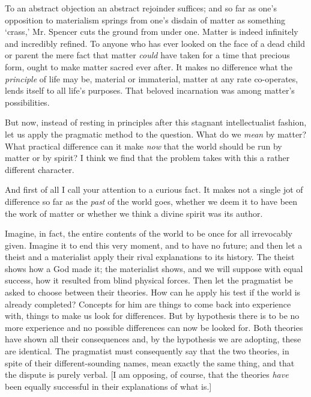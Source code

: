 \documentclass[]{article}
\begin{document}
To an abstract objection an abstract rejoinder suffices; and so far as one's opposition to materialism springs from one's disdain of matter as something `crass,' Mr. Spencer cuts the ground from under one. Matter is indeed infinitely and incredibly refined. To anyone who has ever looked on the face of a dead child or parent the mere fact that matter \emph{could} have taken for a time that precious form, ought to make matter sacred ever after. It makes no difference what the \emph{principle} of life may be, material or immaterial, matter at any rate co-operates, lends itself to all life's purposes. That beloved incarnation was among matter's possibilities.

But now, instead of resting in principles after this stagnant intellectualist fashion, let us apply the pragmatic method to the question. What do we \emph{mean} by matter? What practical difference can it make \emph{now} that the world should be run by matter or by spirit? I think we find that the problem takes with this a rather different character.

And first of all I call your attention to a curious fact. It makes not a single jot of difference so far as the \emph{past} of the world goes, whether we deem it to have been the work of matter or whether we think a divine spirit was its author.

Imagine, in fact, the entire contents of the world to be once for all irrevocably given. Imagine it to end this very moment, and to have no future; and then let a theist and a materialist apply their rival explanations to its history. The theist shows how a God made it; the materialist shows, and we will suppose with equal success, how it resulted from blind physical forces. Then let the pragmatist be asked to choose between their theories. How can he apply his test if the world is already completed? Concepts for him are things to come back into experience with, things to make us look for differences. But by hypothesis there is to be no more experience and no possible differences can now be looked for. Both theories have shown all their consequences and, by the hypothesis we are adopting, these are identical. The pragmatist must consequently say that the two theories, in spite of their different-sounding names, mean exactly the same thing, and that the dispute is purely verbal. [I am opposing, of course, that the theories \emph{have} been equally successful in their explanations of what is.]
\end{document}
